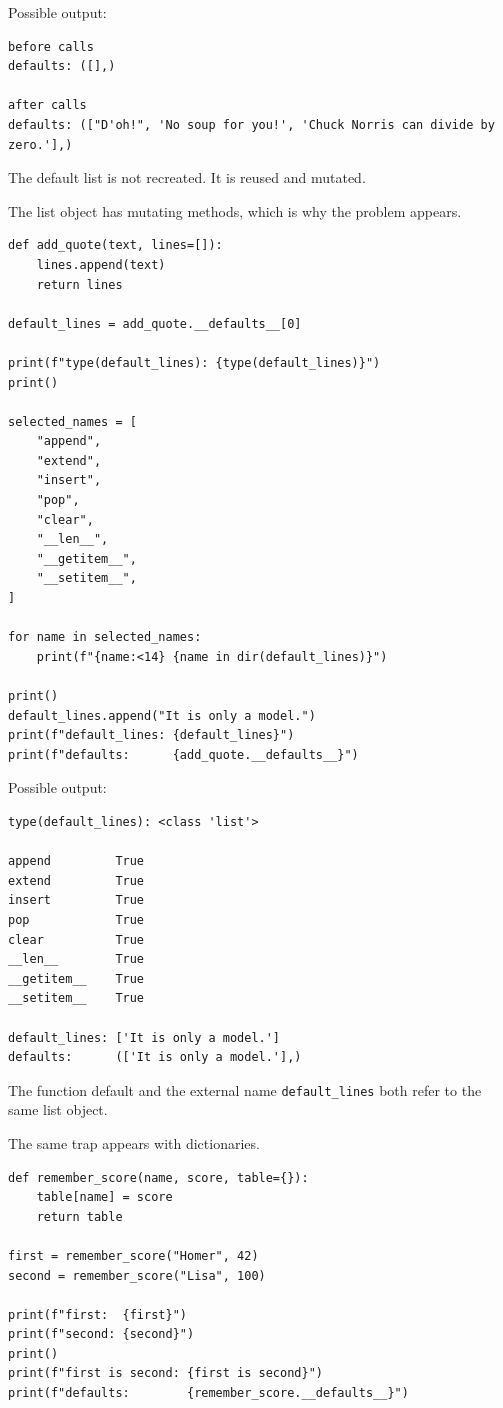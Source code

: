 Possible output:

\begin{verbatim}
before calls
defaults: ([],)

after calls
defaults: (["D'oh!", 'No soup for you!', 'Chuck Norris can divide by zero.'],)
\end{verbatim}

The default list is not recreated. It is reused and mutated.

The list object has mutating methods, which is why the problem appears.

\begin{verbatim}
def add_quote(text, lines=[]):
    lines.append(text)
    return lines

default_lines = add_quote.__defaults__[0]

print(f"type(default_lines): {type(default_lines)}")
print()

selected_names = [
    "append",
    "extend",
    "insert",
    "pop",
    "clear",
    "__len__",
    "__getitem__",
    "__setitem__",
]

for name in selected_names:
    print(f"{name:<14} {name in dir(default_lines)}")

print()
default_lines.append("It is only a model.")
print(f"default_lines: {default_lines}")
print(f"defaults:      {add_quote.__defaults__}")
\end{verbatim}

Possible output:

\begin{verbatim}
type(default_lines): <class 'list'>

append         True
extend         True
insert         True
pop            True
clear          True
__len__        True
__getitem__    True
__setitem__    True

default_lines: ['It is only a model.']
defaults:      (['It is only a model.'],)
\end{verbatim}

The function default and the external name \texttt{default\_lines} both refer to the same list object.

The same trap appears with dictionaries.

\begin{verbatim}
def remember_score(name, score, table={}):
    table[name] = score
    return table

first = remember_score("Homer", 42)
second = remember_score("Lisa", 100)

print(f"first:  {first}")
print(f"second: {second}")
print()
print(f"first is second: {first is second}")
print(f"defaults:        {remember_score.__defaults__}")
\end{verbatim}

